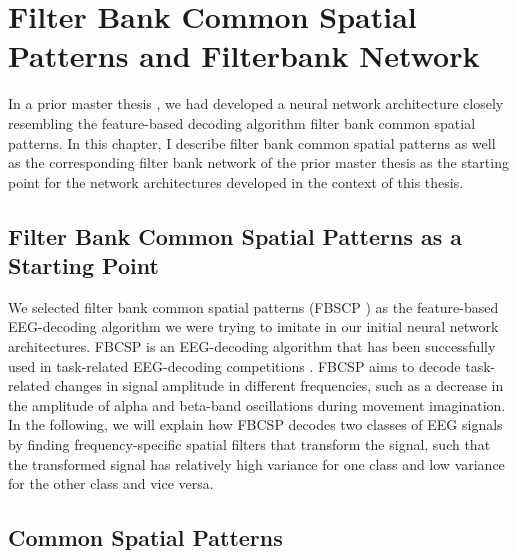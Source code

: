 \chapter{Filter Bank Common Spatial Patterns and
Filterbank Network}\label{fbscp-and-filterbank-net}



    In a prior master thesis
\citep{schirrmeister_msc_thesis_2015}, we had developed a
neural network architecture closely resembling the feature-based
decoding algorithm filter bank common spatial patterns. In this chapter,
I describe filter bank common spatial patterns as well as the
corresponding filter bank network of the prior master thesis as the
starting point for the network architectures developed in the context of
this thesis.

\section{Filter Bank Common Spatial Patterns as a Starting
Point}\label{filter-bank-common-spatial-patterns-as-a-starting-point}


We selected filter bank common spatial patterns (FBSCP
\cite{ang_filter_2008,chin_multi-class_2009}) as the
feature-based EEG-decoding algorithm we were trying to imitate in our
initial neural network architectures. FBCSP is an EEG-decoding algorithm
that has been successfully used in task-related EEG-decoding
competitions \cite{tangermann_review_2012}. FBCSP aims to
decode task-related changes in signal amplitude in different
frequencies, such as a decrease in the amplitude of alpha and beta-band
oscillations during movement imagination. In the following, we will
explain how FBCSP decodes two classes of EEG signals by finding
frequency-specific spatial filters that transform the signal, such that
the transformed signal has relatively high variance for one class and low variance for the
other class and vice versa.


\section{Common Spatial Patterns}\label{common-spatial-patterns}



